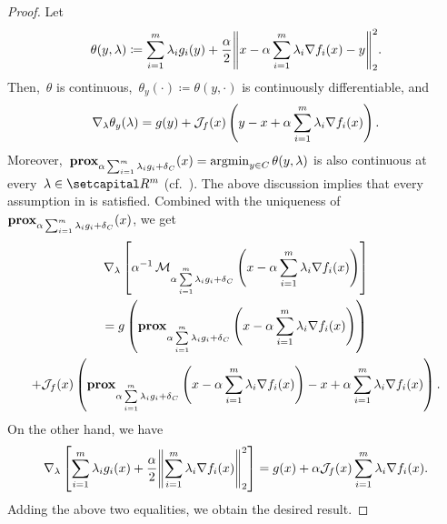 \documentclass[../../main]{subfiles}
\begin{document}
                           \begin{proof}
                               Let
                               \begin{equation}
                                   \theta(y, \lambda) \coloneqq \sum_{i = 1}^{m} \lambda_i g_i(y) + \frac{\alpha}{2} \norm*{x - \alpha \sum_{i = 1}^{m} \lambda_i \nabla f_i(x) - y}_2^2
                               .\end{equation} 
                               Then,~$\theta$ is continuous,~$\theta_y(\cdot) \coloneqq \theta(y, \cdot)$ is continuously differentiable, and
                               \begin{equation}
                                   \nabla_\lambda \theta_y(\lambda) = g(y) + \mathcal{J}_{f}(x) \left( y - x + \alpha \sum_{i = 1}^{m} \lambda_i \nabla f_i(x) \right) 
                               .\end{equation} 
                               Moreover,~$\operatorname{\mathbf{prox}}_{\alpha \sum_{i = 1}^{m} \lambda_i g_i + \operatorname{\delta}_C}(x) = \operatorname*{argmin}_{y \in C} \theta(y, \lambda)$ is also continuous at every~$\lambda \in \setR^m$ (cf.~\cite[Excercise 7.38]{Rockafellar1998}).
                               The above discussion implies that every assumption in  is satisfied.
                               Combined with the uniqueness of~$\operatorname{\mathbf{prox}}_{\alpha \sum_{i = 1}^{m} \lambda_i g_i + \operatorname{\delta}_C}(x)$, we get
                               \begin{multline}
                                   \nabla_\lambda \left[ \alpha^{-1} \operatorname{\mathcal{M}}_{\alpha \sum\limits_{i = 1}^{m} \lambda_i g_i + \operatorname{\delta}_C}\left( x - \alpha \sum_{i = 1}^{m} \lambda_i \nabla f_i(x) \right) \right] \\
                                   = g\left( \operatorname{\mathbf{prox}}_{\alpha \sum\limits_{i = 1}^{m} \lambda_i g_i + \operatorname{\delta}_C}\left( x - \alpha \sum_{i = 1}^{m} \lambda_i \nabla f_i(x) \right) \right) \\
                                   + \mathcal{J}_{f}(x) \left( \operatorname{\mathbf{prox}}_{\alpha \sum\limits_{i = 1}^{m} \lambda_i g_i + \operatorname{\delta}_C}\left( x - \alpha \sum_{i = 1}^{m} \lambda_i \nabla f_i(x) \right) - x + \alpha \sum_{i = 1}^{m} \lambda_i \nabla f_i(x) \right) 
                               .\end{multline}
                               On the other hand, we have
                               \begin{equation}
                                   \nabla_\lambda \left[ \sum_{i = 1}^{m} \lambda_i g_i(x) + \frac{\alpha}{2} \norm*{\sum_{i = 1}^{m} \lambda_i \nabla f_i(x)}_2^2 \right] = g(x) + \alpha \jdv{f}{x} \sum_{i = 1}^{m} \lambda_i \nabla f_i(x) 
                               .\end{equation} 
                               Adding the above two equalities, we obtain the desired result.
                           \end{proof}
\end{document}

